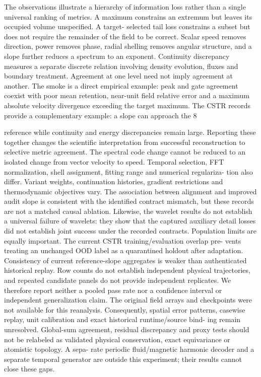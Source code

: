 \documentclass[11pt]{article}
\begin{document}
The observations illustrate a hierarchy of information loss rather than a single universal ranking of
metrics. A maximum constrains an extremum but leaves its occupied volume unspecified. A target-
selected tail loss constrains a subset but does not require the remainder of the field to be correct.
Scalar speed removes direction, power removes phase, radial shelling removes angular structure, and
a slope further reduces a spectrum to an exponent. Continuity discrepancy measures a separate
discrete relation involving density evolution, fluxes and boundary treatment. Agreement at one
level need not imply agreement at another.
The smoke is a direct empirical example: peak and gate agreement coexist with poor mean
retention, near-unit field relative error and a maximum absolute velocity divergence exceeding the
target maximum. The CSTR records provide a complementary example: a slope can approach the
8

reference while continuity and energy discrepancies remain large. Reporting these together changes
the scientific interpretation from successful reconstruction to selective metric agreement.
The spectral code change cannot be reduced to an isolated change from vector velocity to speed.
Temporal selection, FFT normalization, shell assignment, fitting range and numerical regulariza-
tion also differ. Variant weights, continuation histories, gradient restrictions and thermodynamic
objectives vary. The association between alignment and improved audit slope is consistent with
the identified contract mismatch, but these records are not a matched causal ablation. Likewise,
the wavelet results do not establish a universal failure of wavelets: they show that the captured
auxiliary detail losses did not establish joint success under the recorded contracts.
Population limits are equally important. The current CSTR training/evaluation overlap pre-
vents treating an unchanged OOD label as a quarantined holdout after adaptation. Consistency
of current reference-slope aggregates is weaker than authenticated historical replay. Row counts
do not establish independent physical trajectories, and repeated candidate panels do not provide
independent replicates. We therefore report neither a pooled pass rate nor a confidence interval or
independent generalization claim.
The original field arrays and checkpoints were not available for this reanalysis. Consequently,
spatial error patterns, casewise replay, unit calibration and exact historical runtime/source bind-
ing remain unresolved. Global-sum agreement, residual discrepancy and proxy tests should not
be relabeled as validated physical conservation, exact equivariance or atomistic topology. A sepa-
rate periodic fluid/magnetic harmonic decoder and a separate temporal generator are outside this
experiment; their results cannot close these gaps.
\end{document}
